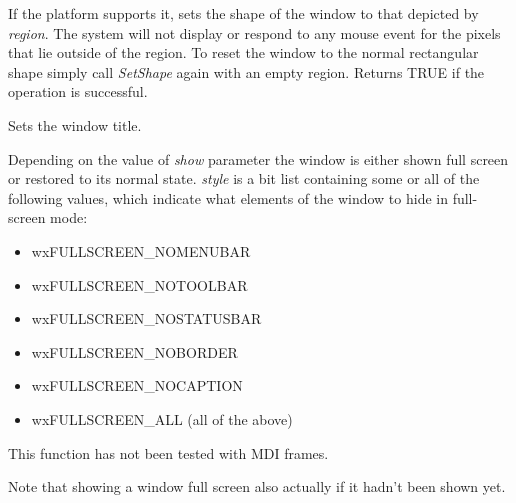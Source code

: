 If the platform supports it, sets the shape of the window to that
depicted by {\it region}.  The system will not display or
respond to any mouse event for the pixels that lie outside of the
region.  To reset the window to the normal rectangular shape simply
call {\it SetShape} again with an empty region.  Returns TRUE if the
operation is successful.


\label{wxtoplevelwindowsettitle}


Sets the window title.






\label{wxtoplevelwindowshowfullscreen}


Depending on the value of {\it show} parameter the window is either shown full
screen or restored to its normal state. {\it style} is a bit list containing
some or all of the following values, which indicate what elements of the window
to hide in full-screen mode:

\begin{itemize}\itemsep=0pt
\item wxFULLSCREEN\_NOMENUBAR
\item wxFULLSCREEN\_NOTOOLBAR
\item wxFULLSCREEN\_NOSTATUSBAR
\item wxFULLSCREEN\_NOBORDER
\item wxFULLSCREEN\_NOCAPTION
\item wxFULLSCREEN\_ALL (all of the above)
\end{itemize}

This function has not been tested with MDI frames.

Note that showing a window full screen also actually
 if it hadn't been shown yet.



